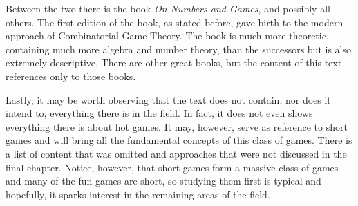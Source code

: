 Between the two there is the book \textit{On Numbers and Games}\cite{ONAG1}\cite{ONAG2}, and possibly all others. The first edition of the book, as stated before, gave birth to the modern approach of Combinatorial Game Theory. The book is much more theoretic, containing much more algebra and number theory, than the successors but is also extremely descriptive. There are other great books, but the content of this text references only to those books.

Lastly, it may be worth observing that the text does not contain, nor does it intend to, everything there is in the field. In fact, it does not even shows everything there is about hot games. It may, however, serve as reference to short games and will bring all the fundamental concepts of this class of games. There is a list of content that was omitted and approaches that were not discussed in the final chapter. Notice, however, that short games form a massive class of games and many of the fun games are short, so studying them first is typical and hopefully, it sparks interest in the remaining areas of the field.














